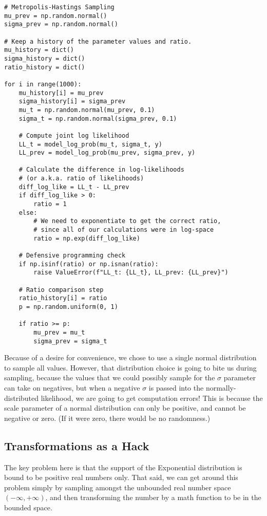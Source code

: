\begin{lstlisting}
# Metropolis-Hastings Sampling
mu_prev = np.random.normal()
sigma_prev = np.random.normal()

# Keep a history of the parameter values and ratio.
mu_history = dict()
sigma_history = dict()
ratio_history = dict()

for i in range(1000):
    mu_history[i] = mu_prev
    sigma_history[i] = sigma_prev
    mu_t = np.random.normal(mu_prev, 0.1)
    sigma_t = np.random.normal(sigma_prev, 0.1)

    # Compute joint log likelihood
    LL_t = model_log_prob(mu_t, sigma_t, y)
    LL_prev = model_log_prob(mu_prev, sigma_prev, y)

    # Calculate the difference in log-likelihoods
    # (or a.k.a. ratio of likelihoods)
    diff_log_like = LL_t - LL_prev
    if diff_log_like > 0:
        ratio = 1
    else:
        # We need to exponentiate to get the correct ratio,
        # since all of our calculations were in log-space
        ratio = np.exp(diff_log_like)

    # Defensive programming check
    if np.isinf(ratio) or np.isnan(ratio):
        raise ValueError(f"LL_t: {LL_t}, LL_prev: {LL_prev}")

    # Ratio comparison step
    ratio_history[i] = ratio
    p = np.random.uniform(0, 1)

    if ratio >= p:
        mu_prev = mu_t
        sigma_prev = sigma_t
\end{lstlisting}

Because of a desire for convenience, we chose to use a single normal distribution to sample all values. However, that distribution choice is going to bite us during sampling, because the values that we could possibly sample for the $\sigma$ parameter can take on negatives, but when a negative $\sigma$ is passed into the normally-distributed likelihood, we are going to get computation errors! This is because the scale parameter of a normal distribution can only be positive, and cannot be negative or zero. (If it were zero, there would be no randomness.)

\subsection{Transformations as a Hack}

The key problem here is that the support of the Exponential distribution is bound to be positive real numbers only. That said, we can get around this problem simply by sampling amongst the unbounded real number space $(-\infty,+\infty)$, and then transforming the number by a math function to be in the bounded space.

